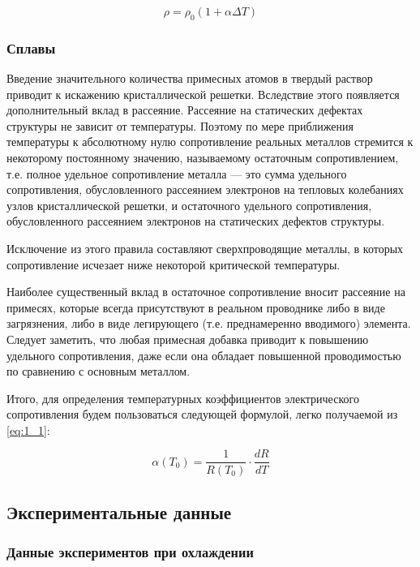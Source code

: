 \documentclass[a4paper, 12pt]{article}
\begin{document}
\begin{equation}
	\rho=\rho_0(1 + \alpha\Delta T )
	\label{eq:1_1}
\end{equation}

\subsubsection{Сплавы}
Введение значительного количества примесных атомов в твердый раствор приводит к искажению кристаллической решетки. Вследствие этого появляется дополнительный вклад в рассеяние. Рассеяние на статических дефектах структуры не зависит от температуры. Поэтому по мере приближения температуры к абсолютному нулю сопротивление реальных металлов стремится к некоторому постоянному значению, называемому остаточным сопротивлением, т.е. полное удельное сопротивление металла --- это сумма удельного сопротивления, обусловленного рассеянием электронов на тепловых колебаниях узлов кристаллической решетки, и остаточного удельного сопротивления, обусловленного рассеянием электронов на статических дефектов структуры.


Исключение из этого правила составляют сверхпроводящие металлы, в которых сопротивление исчезает ниже некоторой критической температуры.

Наиболее существенный вклад в остаточное сопротивление вносит рассеяние на примесях, которые всегда присутствуют в реальном проводнике либо в виде загрязнения, либо в виде легирующего (т.е. преднамеренно вводимого) элемента. Следует заметить, что любая примесная добавка приводит к повышению удельного сопротивления, даже если она обладает повышенной проводимостью по сравнению с основным металлом.

Итого, для определения температурных коэффициентов электрического сопротивления будем пользоваться следующей формулой, легко получаемой из \ref{eq:1_1}:

\begin{equation}
	\alpha(T_0) = \frac{1}{R(T_0)} \cdot \frac{d R}{d T}
\end{equation}

\subsection{Экспериментальные данные}

\subsubsection{Данные экспериментов при охлаждении}
\end{document}
